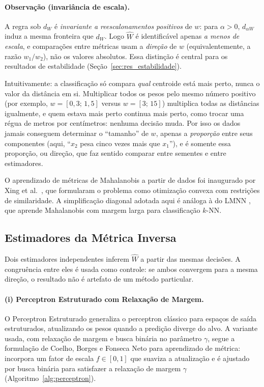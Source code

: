 \documentclass[12pt,a4paper]{article}
\newcommand{\West}{\ensuremath{\hat{W}}}   %
\begin{document}
\paragraph{Observação (invariância de escala).}
A regra sob $d_W$ é \emph{invariante a reescalonamentos positivos} de $w$: para $\alpha>0$,
$d_{\alpha W}$ induz a mesma fronteira que $d_W$. Logo \West{} é identificável apenas
\emph{a menos de escala}, e comparações entre métricas usam a \emph{direção} de $w$
(equivalentemente, a razão $w_1/w_2$), não os valores absolutos. Essa distinção é central
para os resultados de estabilidade (Seção~\ref{sec:res_estabilidade}).

Intuitivamente: a classificação só compara \emph{qual} centroide está mais perto, nunca o
valor da distância em si. Multiplicar todos os pesos pelo mesmo número positivo (por
exemplo, $w = [0{,}3;\,1{,}5]$ versus $w = [3;\,15]$) multiplica todas as distâncias
igualmente, e quem estava mais perto continua mais perto, como trocar uma régua de metros
por centímetros: nenhuma decisão muda. Por isso os dados jamais conseguem determinar o
``tamanho'' de $w$, apenas a \emph{proporção} entre seus componentes (aqui, ``$x_2$ pesa
cinco vezes mais que $x_1$''), e é somente essa proporção, ou direção, que faz sentido
comparar entre sementes e entre estimadores.

O aprendizado de métricas de Mahalanobis a partir de dados foi inaugurado por Xing et
al.~\cite{xingDistanceMetric2002}, que formularam o problema como otimização convexa com
restrições de similaridade. A simplificação diagonal adotada aqui é análoga à do LMNN
\cite{weinbergerDistanceMetric2009}, que
aprende Mahalanobis com margem larga para classificação $k$-NN.

\subsection{Estimadores da Métrica Inversa}

Dois estimadores independentes inferem \West{} a partir das mesmas decisões. A congruência
entre eles é usada como controle: se ambos convergem para a mesma direção, o resultado não
é artefato de um método particular.

\paragraph{(i) Perceptron Estruturado com Relaxação de Margem.}
O Perceptron Estruturado \cite{collinsDiscriminativeTraining2002} generaliza o perceptron
clássico para espaços de saída estruturados, atualizando os pesos quando a predição diverge
do alvo. A variante usada, com relaxação de margem e busca binária no parâmetro $\gamma$,
segue a formulação de Coelho, Borges e Fonseca Neto \cite{coelhoPredicaoEstruturada2017}
para aprendizado de métrica: incorpora um fator de escala $f \in [0,1]$ que suaviza a
atualização e é ajustado por busca binária para satisfazer a relaxação de margem $\gamma$
(Algoritmo~\ref{alg:perceptron}).
\end{document}
